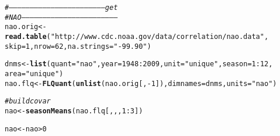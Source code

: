 \documentclass[a4paper,english,10pt]{article}\usepackage[]{graphicx}\usepackage[]{color}
\makeatletter
\newcommand{\hlnum}[1]{\textcolor[rgb]{0.686,0.059,0.569}{#1}}%
\newcommand{\hlstr}[1]{\textcolor[rgb]{0.192,0.494,0.8}{#1}}%
\newcommand{\hlcom}[1]{\textcolor[rgb]{0.678,0.584,0.686}{\textit{#1}}}%
\newcommand{\hlopt}[1]{\textcolor[rgb]{0,0,0}{#1}}%
\newcommand{\hlstd}[1]{\textcolor[rgb]{0.345,0.345,0.345}{#1}}%
\newcommand{\hlkwb}[1]{\textcolor[rgb]{0.69,0.353,0.396}{#1}}%
\newcommand{\hlkwc}[1]{\textcolor[rgb]{0.333,0.667,0.333}{#1}}%
\newcommand{\hlkwd}[1]{\textcolor[rgb]{0.737,0.353,0.396}{\textbf{#1}}}%
\newenvironment{kframe}{%
 \def\at@end@of@kframe{}%
 \ifinner\ifhmode%
  \def\at@end@of@kframe{\end{minipage}}%
  \begin{minipage}{\columnwidth}%
 \fi\fi%
 \def\FrameCommand##1{\hskip\@totalleftmargin \hskip-\fboxsep
 \colorbox{shadecolor}{##1}\hskip-\fboxsep
     \hskip-\linewidth \hskip-\@totalleftmargin \hskip\columnwidth}%
 \MakeFramed {\advance\hsize-\width
   \@totalleftmargin\z@ \linewidth\hsize
   \@setminipage}}%
 {\par\unskip\endMakeFramed%
 \at@end@of@kframe}
\newenvironment{knitrout}{}{} %
\makeatother
\begin{document}
\begin{knitrout}
\color{fgcolor}\begin{kframe}
\begin{alltt}
\hlcom{# -------------------------------------------------------------------- get}
\hlcom{# NAO --------------------------------------------------------------------}
\hlstd{nao.orig} \hlkwb{<-} \hlkwd{read.table}\hlstd{(}\hlstr{"http://www.cdc.noaa.gov/data/correlation/nao.data"}\hlstd{,}
    \hlkwc{skip} \hlstd{=} \hlnum{1}\hlstd{,} \hlkwc{nrow} \hlstd{=} \hlnum{62}\hlstd{,} \hlkwc{na.strings} \hlstd{=} \hlstr{"-99.90"}\hlstd{)}
\end{alltt}


{\ttfamily\noindent\color{warningcolor}{\#\# Warning: unable to connect to 'www.cdc.noaa.gov' on port 80.}}

{\ttfamily\noindent\bfseries\color{errorcolor}{\#\# Error: cannot open the connection}}\begin{alltt}
\hlstd{dnms} \hlkwb{<-} \hlkwd{list}\hlstd{(}\hlkwc{quant} \hlstd{=} \hlstr{"nao"}\hlstd{,} \hlkwc{year} \hlstd{=} \hlnum{1948}\hlopt{:}\hlnum{2009}\hlstd{,} \hlkwc{unit} \hlstd{=} \hlstr{"unique"}\hlstd{,} \hlkwc{season} \hlstd{=} \hlnum{1}\hlopt{:}\hlnum{12}\hlstd{,}
    \hlkwc{area} \hlstd{=} \hlstr{"unique"}\hlstd{)}
\hlstd{nao.flq} \hlkwb{<-} \hlkwd{FLQuant}\hlstd{(}\hlkwd{unlist}\hlstd{(nao.orig[,} \hlopt{-}\hlnum{1}\hlstd{]),} \hlkwc{dimnames} \hlstd{= dnms,} \hlkwc{units} \hlstd{=} \hlstr{"nao"}\hlstd{)}
\end{alltt}


{\ttfamily\noindent\bfseries\color{errorcolor}{\#\# Error: error in evaluating the argument 'object' in selecting a method for function 'FLQuant': Error in unlist(nao.orig[, -1]) : object 'nao.orig' not found}}\begin{alltt}
\hlcom{# build covar}
\hlstd{nao} \hlkwb{<-} \hlkwd{seasonMeans}\hlstd{(nao.flq[, , ,} \hlnum{1}\hlopt{:}\hlnum{3}\hlstd{])}
\end{alltt}


{\ttfamily\noindent\bfseries\color{errorcolor}{\#\# Error: error in evaluating the argument 'x' in selecting a method for function 'seasonMeans': Error: object 'nao.flq' not found}}\begin{alltt}
\hlstd{nao} \hlkwb{<-} \hlstd{nao} \hlopt{>} \hlnum{0}
\end{alltt}



\end{kframe}
\end{knitrout}
\end{document}
